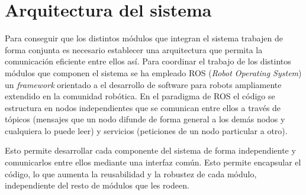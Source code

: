 \chapter{Arquitectura del sistema}

Para conseguir que los distintos módulos que integran el sistema trabajen de forma conjunta es necesario establecer una arquitectura que permita la comunicación eficiente entre ellos así. Para coordinar el trabajo de los distintos módulos que componen el sistema se ha empleado ROS (\textit{Robot Operating System}) \cite{ros} un \textit{framework} orientado a el desarrollo de software para robots ampliamente extendido en la comunidad robótica. En el paradigma de ROS el código se estructura en nodos independientes que se comunican entre ellos a través de tópicos (mensajes que un nodo difunde de forma general a los demás nodos y cualquiera lo puede leer) y servicios (peticiones de un nodo particular a otro).

Esto permite desarrollar cada componente del sistema de forma independiente y comunicarlos entre ellos mediante una interfaz común. Esto permite encapsular el código, lo que aumenta la reusabilidad y la robustez de cada módulo, independiente del resto de módulos que les rodeen.

